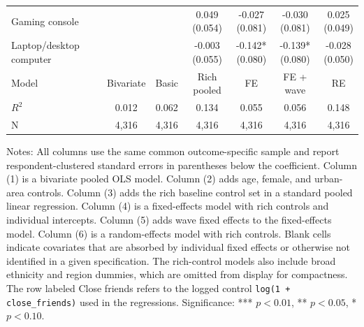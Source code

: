 \begin{table}[!htbp]
\begin{tabular}{p{}cccccc}
\\
Gaming console &  &  & \shortstack[c]{0.049 \\[-0.35ex] (0.054)} & \shortstack[c]{-0.027 \\[-0.35ex] (0.081)} & \shortstack[c]{-0.030 \\[-0.35ex] (0.081)} & \shortstack[c]{0.025 \\[-0.35ex] (0.049)}
\\
Laptop/desktop computer &  &  & \shortstack[c]{-0.003 \\[-0.35ex] (0.055)} & \shortstack[c]{-0.142* \\[-0.35ex] (0.080)} & \shortstack[c]{-0.139* \\[-0.35ex] (0.080)} & \shortstack[c]{-0.028 \\[-0.35ex] (0.050)}
\\
\hline
Model & Bivariate & Basic & Rich pooled & FE & FE + wave & RE
\\
$R^2$ & 0.012 & 0.062 & 0.134 & 0.055 & 0.056 & 0.148
\\
N & 4,316 & 4,316 & 4,316 & 4,316 & 4,316 & 4,316
\\
\hline
\end{tabular}
\renewcommand{\arraystretch}{1}
\begin{minipage}{0.97\textwidth}
\footnotesize Notes: All columns use the same common outcome-specific sample and report respondent-clustered standard errors in parentheses below the coefficient. Column (1) is a bivariate pooled OLS model. Column (2) adds age, female, and urban-area controls. Column (3) adds the rich baseline control set in a standard pooled linear regression. Column (4) is a fixed-effects model with rich controls and individual intercepts. Column (5) adds wave fixed effects to the fixed-effects model. Column (6) is a random-effects model with rich controls. Blank cells indicate covariates that are absorbed by individual fixed effects or otherwise not identified in a given specification. The rich-control models also include broad ethnicity and region dummies, which are omitted from display for compactness. The row labeled Close friends refers to the logged control \texttt{log(1 + close\_friends)} used in the regressions. Significance: *** \(p < 0.01\), ** \(p < 0.05\), * \(p < 0.10\).
\end{minipage}
\end{table}
